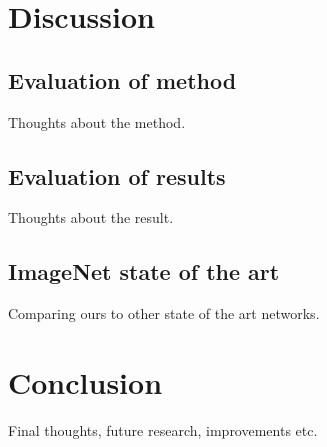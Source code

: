 \documentclass{kthreport}
\begin{document}
\section{Discussion}

\subsection{Evaluation of method}
Thoughts about the method. 

\subsection{Evaluation of results}

Thoughts about the result. 

\subsection{ImageNet state of the art}

Comparing ours to other state of the art networks. 

\section{Conclusion} 
Final thoughts, future research, improvements etc. 

{}

\end{document}
